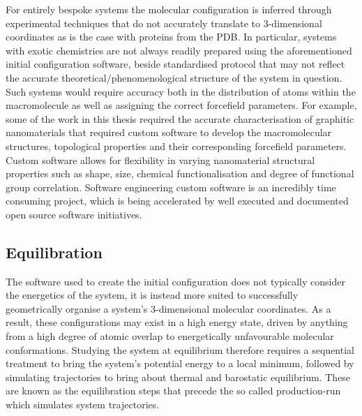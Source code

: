For entirely bespoke systems the molecular configuration is inferred through experimental techniques that do not accurately translate to 3-dimensional coordinates as is the case with proteins from the PDB. In particular, systems with exotic chemistries are not always readily prepared using the aforementioned initial configuration software, beside standardised protocol that may not reflect the accurate theoretical/phenomenological structure of the system in question. Such systems would require accuracy both in the distribution of atoms within the macromolecule as well as assigning the correct forcefield parameters. For example, some of the work in this thesis required the accurate characterisation of graphitic nanomaterials that required custom software to develop the macromolecular structures, topological properties and their corresponding forcefield parameters.\cite{albadri2020accurate-github} Custom software allows for flexibility in varying nanomaterial structural properties such as shape, size, chemical functionalisation and degree of functional group correlation. Software engineering custom software is an incredibly time consuming project, which is being accelerated by well executed and documented open source software initiatives.

\subsection{Equilibration} \label{sec:equilibration}
The software used to create the initial configuration does not typically consider the energetics of the system, it is instead more suited to successfully geometrically organise a system's 3-dimensional molecular coordinates. As a result, these configurations may exist in a high energy state, driven by anything from a high degree of atomic overlap to energetically unfavourable molecular conformations. Studying the system at equilibrium therefore requires a sequential treatment to bring the system's potential energy to a local minimum, followed by simulating trajectories to bring about thermal and barostatic equilibrium. These are known as the equilibration steps that precede the so called production-run which simulates system trajectories. 

